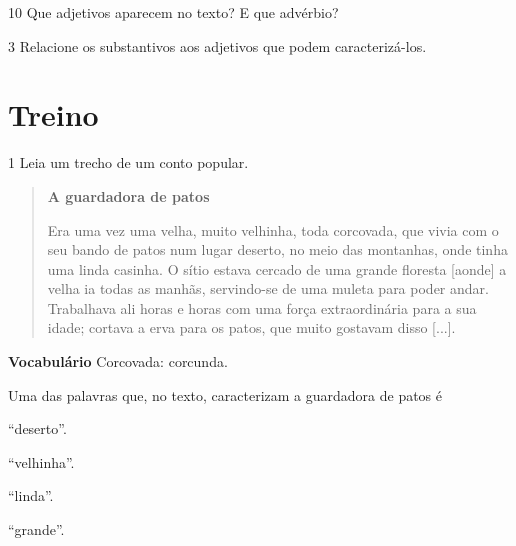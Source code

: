 \num{10} Que adjetivos aparecem no texto? E que advérbio?


\num{3} Relacione os substantivos aos adjetivos que podem caracterizá-los.

\begin{multicols}{2}











\end{multicols}

\section{Treino}

\num{1} Leia um trecho de um conto popular.

\begin{quote}
\textbf{A guardadora de patos}

Era uma vez uma velha, muito velhinha, toda corcovada, que vivia com o
seu bando de patos num lugar deserto, no meio das montanhas, onde tinha
uma linda casinha. O sítio estava cercado de uma grande floresta [aonde] a
velha ia todas as manhãs, servindo-se de uma muleta para poder andar.
Trabalhava ali horas e horas com uma força extraordinária para a sua
idade; cortava a erva para os patos, que muito gostavam disso
{[}...{]}.

\end{quote}

\textbf{Vocabulário}
Corcovada: corcunda.

Uma das palavras que, no texto, caracterizam a guardadora de patos é

\begin{escolha}[itemsep=-5pt]
\item ``deserto''.

\item ``velhinha''.

\item ``linda''.

\item ``grande''.
\end{escolha}



